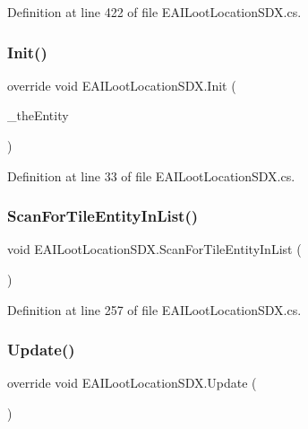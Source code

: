 Definition at line 422 of file E\+A\+I\+Loot\+Location\+S\+D\+X.\+cs.

\mbox{\label{class_e_a_i_loot_location_s_d_x_aed5f1ed4ec13c9bf492e947526c2df52}} 
\subsubsection{\texorpdfstring{Init()}{Init()}}
{\footnotesize\ttfamily override void E\+A\+I\+Loot\+Location\+S\+D\+X.\+Init (\begin{DoxyParamCaption}\item[{Entity\+Alive}]{\+\_\+the\+Entity }\end{DoxyParamCaption})}



Definition at line 33 of file E\+A\+I\+Loot\+Location\+S\+D\+X.\+cs.

\mbox{\label{class_e_a_i_loot_location_s_d_x_a9a88913841b1fa33d45099935a0d5520}} 
\subsubsection{\texorpdfstring{ScanForTileEntityInList()}{ScanForTileEntityInList()}}
{\footnotesize\ttfamily void E\+A\+I\+Loot\+Location\+S\+D\+X.\+Scan\+For\+Tile\+Entity\+In\+List (\begin{DoxyParamCaption}{ }\end{DoxyParamCaption})}



Definition at line 257 of file E\+A\+I\+Loot\+Location\+S\+D\+X.\+cs.

\mbox{\label{class_e_a_i_loot_location_s_d_x_a3fd754bcbfbbe83d865244da9ff53412}} 
\subsubsection{\texorpdfstring{Update()}{Update()}}
{\footnotesize\ttfamily override void E\+A\+I\+Loot\+Location\+S\+D\+X.\+Update (\begin{DoxyParamCaption}{ }\end{DoxyParamCaption})}



